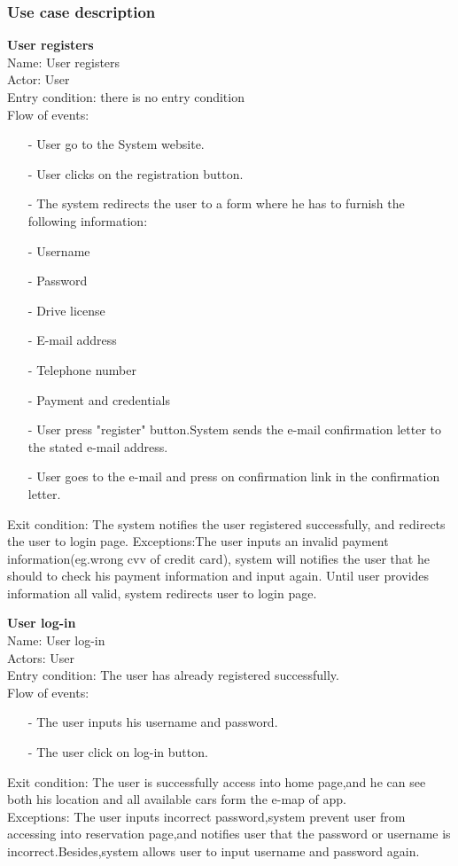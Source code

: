 \documentclass[12pt, letterpaper]{article}
\begin{document}
\subsubsection{Use case description} 

\textbf{User registers} \\
Name: User registers \\
Actor: User \\
Entry condition: there is no entry condition \\
Flow of events: \\
\begin{itemize}
	\item[-] User go to the System website.
	\item[-] User clicks on the registration button.
	\item[-] The system redirects the user to a form where he has to furnish the following information:
	\item[-] Username
	\item[-] Password
	\item[-] Drive license
	\item[-] E-mail address
	\item[-] Telephone number
	\item[-] Payment and credentials
	\item[-] User press "register" button.System sends the e-mail confirmation letter to the stated e-mail
	address.
	\item[-] User goes to the e-mail and press on confirmation link in the confirmation letter.
\end{itemize} 
Exit condition: The system notifies the user registered successfully, and redirects the user to login page.
Exceptions:The user inputs an invalid payment information(eg.wrong cvv of credit card), system will notifies the user that he should to check his payment information and input again. Until user provides information all valid, system redirects user to login page. \\
\vspace{0.5cm}

\textbf{User log-in} \\
Name: User log-in \\
Actors: User \\
Entry condition: The user has already registered successfully. \\
Flow of events: \\
\begin{itemize}
	\item[-] The user inputs his username and password.
	\item[-] The user click on log-in button.
\end{itemize}
Exit condition: The user is successfully access into home page,and he can see both his location
and all available cars form the e-map of app. \\
Exceptions: The user inputs incorrect password,system prevent user from accessing into
reservation page,and notifies user that the password or username is incorrect.Besides,system
allows user to input username and password again. \\
\vspace{0.5cm}
\end{document}
